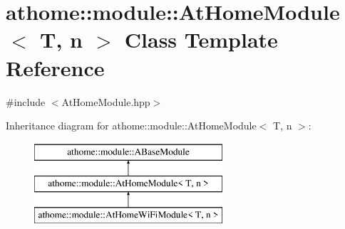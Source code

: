 \hypertarget{classathome_1_1module_1_1_at_home_module}{}\section{athome\+:\+:module\+:\+:At\+Home\+Module$<$ T, n $>$ Class Template Reference}
\label{classathome_1_1module_1_1_at_home_module}


{\ttfamily \#include $<$At\+Home\+Module.\+hpp$>$}

Inheritance diagram for athome\+:\+:module\+:\+:At\+Home\+Module$<$ T, n $>$\+:\begin{figure}[H]
\begin{center}
\leavevmode
\includegraphics[height=3.000000cm]{classathome_1_1module_1_1_at_home_module}
\end{center}
\end{figure}
